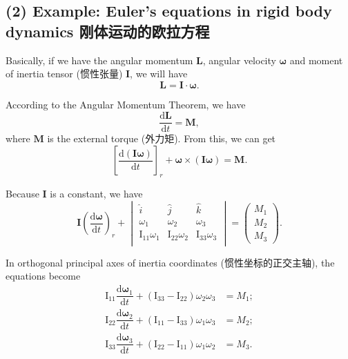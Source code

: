 \subsection*{(2) Example: Euler's equations in rigid body dynamics
刚体运动的欧拉方程}\label{example-eulers-equations-in-rigid-body-dynamics-ux521aux4f53ux8fd0ux52a8ux7684ux6b27ux62c9ux65b9ux7a0b}

Basically, if we have the angular momentum \(\boldsymbol L\), angular
velocity \(\boldsymbol \omega\) and moment of inertia tensor (惯性张量)
\(\mathbf I\), we will have
\[\boldsymbol L = \mathbf I \cdot \boldsymbol \omega.\]

According to the Angular Momentum Theorem, we have
\[\dfrac{\mathrm d \boldsymbol L}{\mathrm dt} = \boldsymbol M,\] where
\(\boldsymbol M\) is the external torque (外力矩). From this, we can get
\[\left[ \dfrac{\mathrm d (\mathbf I \boldsymbol \omega)}{\mathrm dt}\right]_r + \boldsymbol \omega \times (\mathbf I \boldsymbol \omega) = \boldsymbol M.\]

Because \(\mathbf I\) is a constant, we have
\[\mathbf I \left( \dfrac{\mathrm d \boldsymbol \omega}{\mathrm dt} \right)_r + \begin{vmatrix}
    \hat i & \hat j & \hat k \\
    \omega_1 & \omega_2 & \omega_3 \\
    \mathrm I_{11} \omega_1 & \mathrm I_{22} \omega_2 & \mathrm I_{33} \omega_3 \\
\end{vmatrix} =\begin{pmatrix}
    M_1 \\ M_2 \\ M_3
\end{pmatrix}.\]

In orthogonal principal axes of inertia coordinates
(惯性坐标的正交主轴), the equations become \begin{align*}
    \mathrm I_{11} \dfrac{\mathrm d \boldsymbol \omega_1}{\mathrm dt} + (\mathrm I_{33} - \mathrm I_{22}) \omega_2 \omega_3 & = M_1; \\
    \mathrm I_{22} \dfrac{\mathrm d \boldsymbol \omega_2}{\mathrm dt} + (\mathrm I_{11} - \mathrm I_{33}) \omega_1 \omega_3 & = M_2; \\
    \mathrm I_{33} \dfrac{\mathrm d \boldsymbol \omega_3}{\mathrm dt} + (\mathrm I_{22} - \mathrm I_{11}) \omega_1 \omega_2 & = M_3.
\end{align*}
